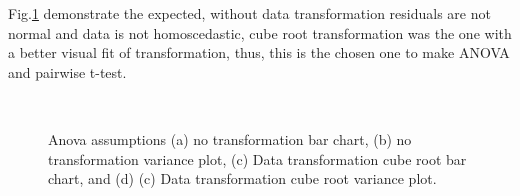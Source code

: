 \documentclass[conference]{IEEEtran}
\begin{document}
Fig.\ref{fig_assumptions} demonstrate the expected, without data transformation residuals are not normal and data is not homoscedastic, cube root transformation was the one with a better visual fit of transformation, thus, this is the chosen one to make ANOVA and pairwise t-test.

\begin{figure}[h]
    \centering
    \hfill
    \\
    \hfill
  \caption{Anova assumptions (a) no transformation bar chart, (b) no transformation variance plot, (c) Data transformation cube root bar chart, and (d) (c) Data transformation cube root variance plot.}
  \label{fig_assumptions} 
\end{figure}
\end{document}
